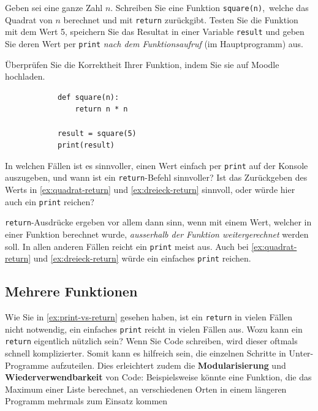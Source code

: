 \begin{myexercise}\label{ex:quadrat-return}
	Geben sei eine ganze Zahl \(n\). Schreiben Sie eine Funktion \lstinline|square(n)|, welche das Quadrat von \(n\) berechnet und mit \lstinline|return| zurückgibt. Testen Sie die Funktion mit dem Wert 5, speichern Sie das Resultat in einer Variable \lstinline|result| und geben Sie deren Wert per \lstinline|print| \textit{nach dem Funktionsaufruf} (im Hauptprogramm) aus.

	Überprüfen Sie die Korrektheit Ihrer Funktion, indem Sie sie auf Moodle hochladen.
	\begin{myanswer}
		\begin{lstlisting}
			def square(n):
				return n * n

			result = square(5)
			print(result)
		\end{lstlisting}
	\end{myanswer}
\end{myexercise}

\begin{myexercise}\label{ex:print-vs-return}
	In welchen Fällen ist es sinnvoller, einen Wert einfach per \lstinline|print| auf der Konsole auszugeben, und wann ist ein \lstinline|return|-Befehl sinnvoller? Ist das Zurückgeben des Werts in \cref{ex:quadrat-return} und \cref{ex:dreieck-return} sinnvoll, oder würde hier auch ein \lstinline|print| reichen?
	\begin{myanswer}
		\lstinline|return|-Ausdrücke ergeben vor allem dann sinn, wenn mit einem Wert, welcher in einer Funktion berechnet wurde, \textit{ausserhalb der Funktion weitergerechnet} werden soll. In allen anderen Fällen reicht ein \lstinline|print| meist aus. Auch bei \cref{ex:quadrat-return} und \cref{ex:dreieck-return} würde ein einfaches \lstinline|print| reichen.
	\end{myanswer}
\end{myexercise}


\subsection{Mehrere Funktionen}
Wie Sie in \cref{ex:print-vs-return} gesehen haben, ist ein \lstinline|return| in vielen Fällen nicht notwendig, ein einfaches \lstinline|print| reicht in vielen Fällen aus. Wozu kann ein \lstinline|return| eigentlich nützlich sein? Wenn Sie Code schreiben, wird dieser oftmals schnell komplizierter. Somit kann es hilfreich sein, die einzelnen Schritte in Unter-Programme aufzuteilen. Dies erleichtert zudem die \textbf{Modularisierung} und \textbf{Wiederverwendbarkeit} von Code: Beispielsweise könnte eine Funktion, die das Maximum einer Liste berechnet, an verschiedenen Orten in einem längeren Programm mehrmals zum Einsatz kommen

